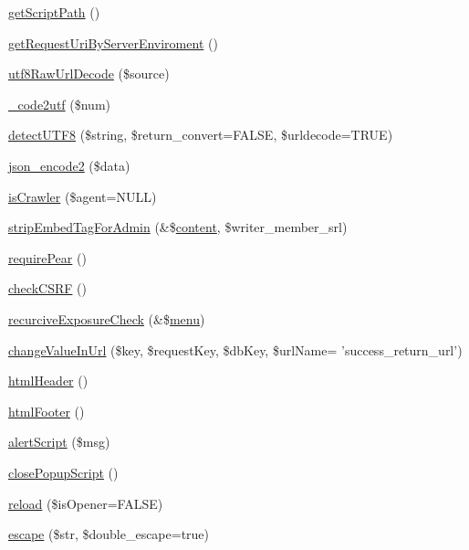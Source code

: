 \begin{DoxyCompactItemize}
\item 
\hyperlink{func_8inc_8php_a1086859329d03f8830d51d254c18e47e}{get\-Script\-Path} ()
\item 
\hyperlink{func_8inc_8php_a372c0e65e6e4778fc4e97b1fc3775463}{get\-Request\-Uri\-By\-Server\-Enviroment} ()
\item 
\hyperlink{func_8inc_8php_af1649820887f052ce1f1c9ca623f2db3}{utf8\-Raw\-Url\-Decode} (\$source)
\item 
\hyperlink{func_8inc_8php_a07446b33f4eda53315b12fc1c1b15f5a}{\-\_\-code2utf} (\$num)
\item 
\hyperlink{func_8inc_8php_a97f60adff3c4bbb5a341a557eef742b0}{detect\-U\-T\-F8} (\$string, \$return\-\_\-convert=F\-A\-L\-S\-E, \$urldecode=T\-R\-U\-E)
\item 
\hyperlink{func_8inc_8php_a3c49ddc63881e57fc5dd1aa4f923ef0c}{json\-\_\-encode2} (\$data)
\item 
\hyperlink{func_8inc_8php_a490ffbd4821da1995c76c381553d5b3d}{is\-Crawler} (\$agent=N\-U\-L\-L)
\item 
\hyperlink{func_8inc_8php_ad6d8ff5f851d62d39b170a46b766d834}{strip\-Embed\-Tag\-For\-Admin} (\&\$\hyperlink{classcontent}{content}, \$writer\-\_\-member\-\_\-srl)
\item 
\hyperlink{func_8inc_8php_ad09c8e07e96c499b4b71d54c2950e704}{require\-Pear} ()
\item 
\hyperlink{func_8inc_8php_a887fd7fe841f5dac3179296ae770172a}{check\-C\-S\-R\-F} ()
\item 
\hyperlink{func_8inc_8php_a229b3ea7ca966e907d266bc60efa353b}{recurcive\-Exposure\-Check} (\&\$\hyperlink{classmenu}{menu})
\item 
\hyperlink{func_8inc_8php_a2382c81f5a0708850f8790668edcaf90}{change\-Value\-In\-Url} (\$key, \$request\-Key, \$db\-Key, \$url\-Name= 'success\-\_\-return\-\_\-url')
\item 
\hyperlink{func_8inc_8php_adf603cdce37b515631c58bb3acffa614}{html\-Header} ()
\item 
\hyperlink{func_8inc_8php_a2f21eda8628bd378f56529cb680006b0}{html\-Footer} ()
\item 
\hyperlink{func_8inc_8php_acc16be2ad7371ac6478f2314f1248fe2}{alert\-Script} (\$msg)
\item 
\hyperlink{func_8inc_8php_a11562ea030a5d83564d0fbfcfabc8af9}{close\-Popup\-Script} ()
\item 
\hyperlink{func_8inc_8php_aaf78eccbde1406d602a7c408a364be24}{reload} (\$is\-Opener=F\-A\-L\-S\-E)
\item 
\hyperlink{func_8inc_8php_aae9d74f601e24cdb2ffa06ab3458eea1}{escape} (\$str, \$double\-\_\-escape=true)

\end{DoxyCompactItemize}
